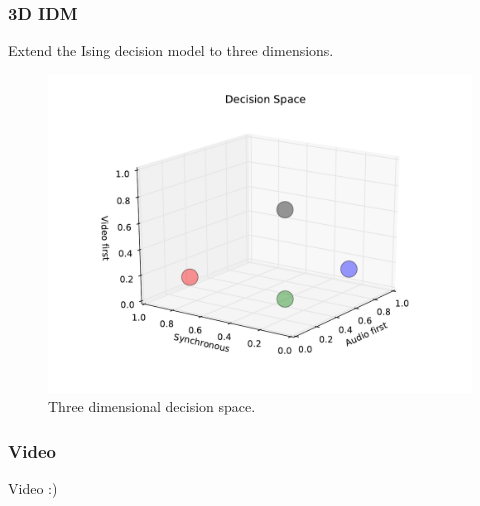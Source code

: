 \documentclass[xcolor={fixpdftex,hyperref,x11names},10pt,pdftex,hyperref={pdftex}]{beamer}
\begin{document}
\begin{frame}
  \frametitle{3D IDM}
  Extend the Ising decision model to three dimensions.

  \begin{figure}[h]
    \centering
    \includegraphics[width=\textwidth]{./figs/decision_space_3d.pdf}
    \caption{Three dimensional decision space.}
    \label{fig:3dspace}
  \end{figure}
\end{frame}

\begin{frame}
  \frametitle{Video}
  Video :)
\end{frame}
\end{document}
